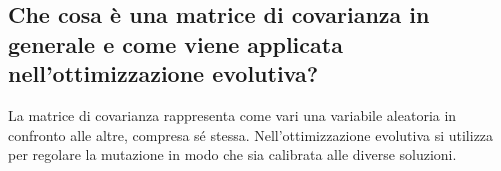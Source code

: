 \documentclass[\main/main.tex]{subfiles}
\begin{document}
\subsection{Che cosa è una matrice di covarianza in generale e come viene applicata nell'ottimizzazione evolutiva?}
La matrice di covarianza rappresenta come vari una variabile aleatoria in confronto alle altre, compresa sé stessa. Nell'ottimizzazione evolutiva si utilizza per regolare la mutazione in modo che sia calibrata alle diverse soluzioni.
\end{document}
